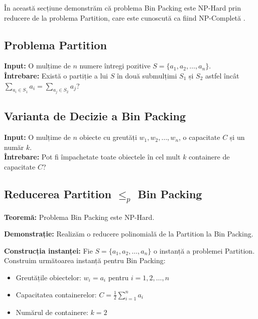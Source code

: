 \documentclass[runningheads]{llncs}
\begin{document}
În această secțiune demonstrăm că problema Bin Packing este NP-Hard prin reducere de la problema Partition, care este cunoscută ca fiind NP-Completă \cite{garey1979computers}.

\subsection{Problema Partition}

\begin{tcolorbox}[BoxTeal, title=\faIcon{question-circle} Definiție: Problema Partition, fonttitle=\bfseries]
\textbf{Input:} O mulțime de $n$ numere întregi pozitive $S = \{a_1, a_2, \ldots, a_n\}$.\\
\textbf{Întrebare:} Există o partiție a lui $S$ în două submulțimi $S_1$ și $S_2$ astfel încât $\sum_{a_i \in S_1} a_i = \sum_{a_j \in S_2} a_j$?
\end{tcolorbox}

\subsection{Varianta de Decizie a Bin Packing}

\begin{tcolorbox}[BoxPurple, title=\faIcon{question-circle} Definiție: Bin Packing (Decizie), fonttitle=\bfseries]
\textbf{Input:} O mulțime de $n$ obiecte cu greutăți $w_1, w_2, \ldots, w_n$, o capacitate $C$ și un număr $k$.\\
\textbf{Întrebare:} Pot fi împachetate toate obiectele în cel mult $k$ containere de capacitate $C$?
\end{tcolorbox}

\subsection{Reducerea Partition $\leq_p$ Bin Packing}

\textbf{Teoremă:} Problema Bin Packing este NP-Hard.

\textbf{Demonstrație:} Realizăm o reducere polinomială de la Partition la Bin Packing.

\textbf{Construcția instanței:} Fie $S = \{a_1, a_2, \ldots, a_n\}$ o instanță a problemei Partition. Construim următoarea instanță pentru Bin Packing:
\begin{itemize}
    \item Greutățile obiectelor: $w_i = a_i$ pentru $i = 1, 2, \ldots, n$
    \item Capacitatea containerelor: $C = \frac{1}{2}\sum_{i=1}^{n} a_i$
    \item Numărul de containere: $k = 2$
\end{itemize}
\end{document}
